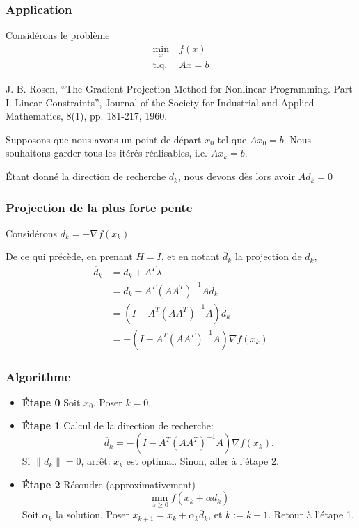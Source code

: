 \documentclass[usepdftitle=false]{beamer}
\begin{document}
\begin{frame}
	\frametitle{Application}
	
	Considérons le problème
	\begin{align*}
	\min_x \ & f(x) \\
	\mbox{t.q. } & Ax = b
	\end{align*}
	
	\mbox{}
	
	J. B. Rosen, ``The Gradient Projection Method for Nonlinear Programming. Part I. Linear Constraints'',  Journal of the Society for Industrial and Applied Mathematics, 8(1), pp. 181-217, 1960.
	
	\mbox{}
	
	Supposons que nous avons un point de départ $x_0$ tel que $Ax_0 = b$.
	Nous souhaitons garder tous les itérés réalisables, i.e. $Ax_k = b$.
	
	\mbox{}
	
	Étant donné la direction de recherche $d_k$, nous devons dès lors avoir $Ad_k = 0$
	
\end{frame}

\begin{frame}
	\frametitle{Projection de la plus forte pente}
	
	Considérons $d_k = -\nabla f(x_k)$.
	
	\mbox{}
	
	De ce qui précède, en prenant $H = I$, et en notant $\overline{d}_k$ la projection de $d_k$,
	\begin{align*}
	\overline{d}_k &= d_k + A^T\lambda \\
	&= d_k - A^T(AA^T)^{-1}Ad_k \\
	&= \left(I-A^T(AA^T)^{-1}A\right)d_k \\
	&= -\left(I-A^T(AA^T)^{-1}A\right)\nabla f(x_k) 
	\end{align*}
	
\end{frame}

\begin{frame}
	\frametitle{Algorithme}
	
	\begin{itemize}
		\item 
		\textbf{Étape 0} Soit $x_0$. Poser $k = 0$.
		\item 
		\textbf{Étape 1}
		Calcul de la direction de recherche:
		$$
		\overline{d}_k = -\left(I-A^T(AA^T)^{-1}A\right)\nabla f(x_k).
		$$
		Si $\| \overline{d}_k \| = 0$, arrêt: $x_k$ est optimal.
		Sinon, aller à l'étape 2.
		\item 
		\textbf{Étape 2}
		Résoudre (approximativement)
		$$
		\min_{\alpha \geq 0} f(x_k+\alpha \overline{d}_k)
		$$
		Soit $\alpha_k$ la solution. Poser $x_{k+1} = x_k + \alpha_k \overline{d}_k$, et $k := k + 1$. Retour à l'étape 1.
	\end{itemize}
	
\end{frame}
\end{document}

